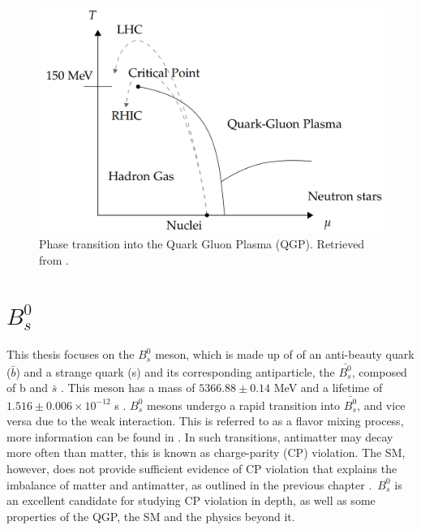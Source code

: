 \begin{figure}[htp!]
	\centering
	\includegraphics[scale=0.34]{MainContent/Figs/QGP.png}
	\caption{Phase transition into the Quark Gluon Plasma (QGP). Retrieved from \cite{parkkila2021quantifying}.}
	\label{fig:qgp}
\end{figure}
\section{$B^0_s$}
\label{sec:b0s}
This thesis focuses on the $B^0_s$ meson, which is made up of of an anti-beauty quark ($\bar{b}$) and a strange quark (s) and its corresponding antiparticle, the $\bar{B^0_s}$, composed of b and $\bar{s}$ \cite{mejia2012medida}. This meson has a mass of $5366.88 \pm 0.14$ MeV and a lifetime of $1.516\pm 0.006 \times 10^{-12}$ s \cite{pdgstrange}. $B^0_s$ mesons undergo a rapid transition into $\bar{B^0_s}$, and vice versa due to the weak interaction. This is referred to as a flavor mixing process, more information can be found in \cite{greevenanalysis, mejia2012medida}. In such transitions, antimatter may decay more often than matter, this is known as charge-parity (CP) violation. The SM, however, does not provide sufficient evidence of CP violation that explains the imbalance of matter and antimatter, as outlined in the previous chapter \cite{greevenanalysis, cern2020lhcb}. $B^0_s$ is an excellent candidate for studying CP violation in depth, as well as some properties of the QGP, the SM and the physics beyond it.

